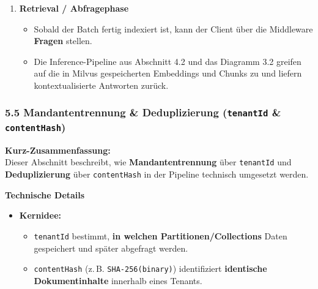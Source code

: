 \begin{enumerate}
  \begin{itemize}
  \tightlist
  \item
    Der AI Service leitet die Embedding-Ergebnisse an den \textbf{Data
    Service} weiter oder schreibt sie direkt in Milvus und meldet den
    Erfolg an den Data Service.\\
  \item
    Der Data Service speichert bzw. ergänzt die Embeddings in
    \textbf{Milvus} an der passenden Stelle (Verknüpfung zu
    \texttt{document\_id}, \texttt{chunk\_id}, \texttt{tenant\_id}).\\
  \item
    In Postgres wird der Status des Dokuments (oder des gesamten
    Batches) auf \texttt{INDEXED} bzw. \texttt{COMPLETED} gesetzt.
  \end{itemize}
\item
  \textbf{Retrieval / Abfragephase}

  \begin{itemize}
  \tightlist
  \item
    Sobald der Batch fertig indexiert ist, kann der Client über die
    Middleware \textbf{Fragen} stellen.\\
  \item
    Die Inference-Pipeline aus Abschnitt 4.2 und das Diagramm 3.2
    greifen auf die in Milvus gespeicherten Embeddings und Chunks zu und
    liefern kontextualisierte Antworten zurück.
  \end{itemize}
\end{enumerate}

\subsubsection{\texorpdfstring{5.5 Mandantentrennung \& Deduplizierung
(\texttt{tenantId} \&
\texttt{contentHash})}{5.5 Mandantentrennung \& Deduplizierung (tenantId \& contentHash)}}\label{mandantentrennung-deduplizierung-tenantid-contenthash}

\textbf{Kurz-Zusammenfassung:}\\
Dieser Abschnitt beschreibt, wie \textbf{Mandantentrennung} über
\texttt{tenantId} und \textbf{Deduplizierung} über \texttt{contentHash}
in der Pipeline technisch umgesetzt werden.

\textbf{Technische Details}

\begin{itemize}
\tightlist
\item
  \textbf{Kernidee:}

  \begin{itemize}
  \tightlist
  \item
    \texttt{tenantId} bestimmt, \textbf{in welchen
    Partitionen/Collections} Daten gespeichert und später abgefragt
    werden.\\
  \item
    \texttt{contentHash} (z.\,B. \texttt{SHA-256(binary)}) identifiziert
    \textbf{identische Dokumentinhalte} innerhalb eines Tenants.
  \end{itemize}
\end{itemize}

